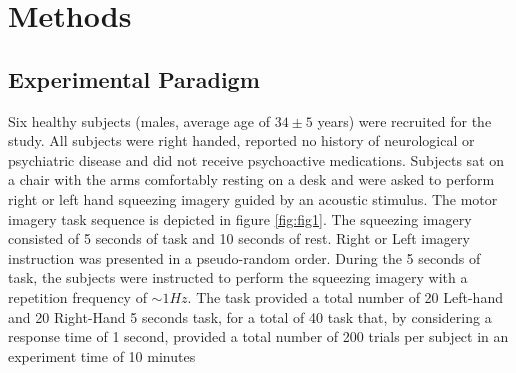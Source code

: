 \documentclass[12pt]{iopart}
\begin{document}
\section{Methods}
\subsection{Experimental Paradigm}
Six healthy subjects (males, average age of $34\pm5$ years) were recruited for the study. All subjects were right handed, reported no history of neurological or psychiatric disease and did not receive psychoactive medications. 
Subjects sat on a chair with the arms comfortably resting on a desk and were asked to perform right or left hand squeezing imagery guided by an acoustic stimulus. The motor imagery task sequence is depicted in figure \ref{fig:fig1}. The squeezing imagery consisted of 5 seconds of task and 10 seconds of rest. Right or Left imagery instruction was presented in a pseudo-random order.  During the 5 seconds of task, the subjects were instructed to perform the squeezing imagery with a repetition frequency of $\sim1Hz$. The task provided a total number of 20 Left-hand and 20 Right-Hand 5 seconds task, for a total of 40 task that, by considering a response time of 1 second, provided a total number of 200 trials per subject in an experiment time of 10 minutes
\end{document}
